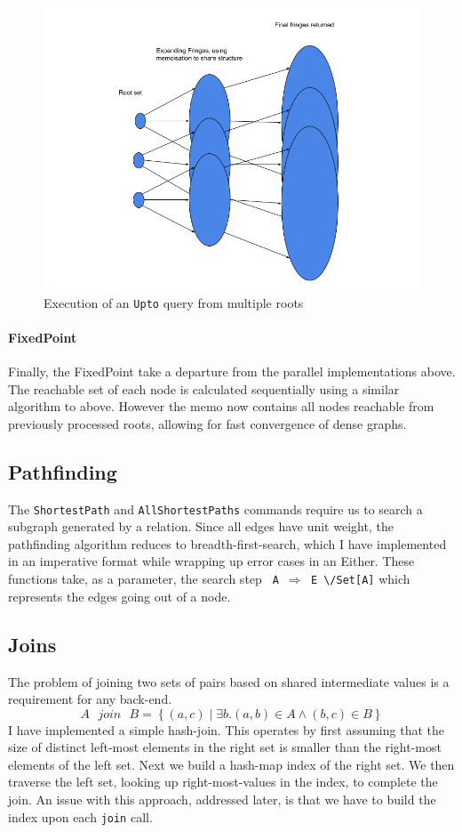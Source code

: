 \documentclass[12pt,a4paper,twoside,openright]{report}
\newcommand\codeName[1]{\texttt{#1}}
\newcommand\either[0]{\textbackslash/}
\newcommand{\setComp}[2]{\left\lbrace #1 \mid #2 \right\rbrace}
\begin{document}
\begin{figure}[ht]
\centering
  \includegraphics[width=\textwidth]{figs/UptoPairs.png}
  \caption{Execution of an \codeName{Upto} query from multiple roots}
  \label{fig:UptoPairs}
\end{figure}
		
		\paragraph{FixedPoint}
Finally, the FixedPoint take a departure from the parallel implementations above. The reachable set of each node is calculated sequentially using a similar algorithm to above. However the memo now contains all nodes reachable from previously processed roots, allowing for fast convergence of dense graphs.	
	
	\subsection{Pathfinding}
	The \codeName{ShortestPath} and \codeName{AllShortestPaths} commands require us to search a subgraph generated by a relation. Since all edges have unit weight, the pathfinding algorithm reduces to breadth-first-search, which I have implemented in an imperative format while wrapping up error cases in an Either. These functions take, as a parameter, the search step \codeName{ A\ $\Rightarrow$ E \either Set[A]} which represents the edges going out of a node. 
	
	\subsection{Joins}
	The problem of joining two sets of pairs based on shared intermediate values is a requirement for any back-end. 
\[
A\mbox{ }join\mbox{ }B = \setComp{(a, c)}{\exists b. (a, b) \in A \wedge (b, c) \in B}
\]	
I have implemented a simple hash-join\cite{HashJoins}. This operates by first assuming that the size of distinct left-most elements in the right set is smaller than the right-most elements of the left set. Next we build a hash-map index of the right set. We then traverse the left set, looking up right-most-values in the index, to complete the join. An issue with this approach, addressed later, is that we have to build the index upon each \codeName{join} call.
\end{document}
